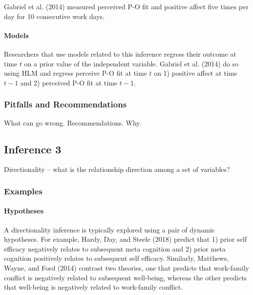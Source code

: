 \documentclass[english,,man]{apa6}
\let\oldparagraph\paragraph
\renewcommand{\paragraph}[1]{\oldparagraph{#1}\mbox{}}
\theoremstyle{definition}
\theoremstyle{definition}
\theoremstyle{definition}
\theoremstyle{remark}
\begin{document}
Gabriel et al. (2014) measured perceived P-O fit and positive affect
five times per day for 10 consecutive work days.

\hypertarget{models-8}{%
\paragraph{Models}\label{models-8}}

Researchers that use models related to this inference regress their
outcome at time \(t\) on a prior value of the independent variable.
Gabriel et al. (2014) do so using HLM and regress perceive P-O fit at
time \(t\) on 1) positive affect at time \(t-1\) and 2) perceived P-O
fit at time \(t-1\).

\hypertarget{pitfalls-and-recommendations-8}{%
\subsubsection{Pitfalls and
Recommendations}\label{pitfalls-and-recommendations-8}}

What can go wrong. Recommendations. Why.

\hypertarget{inference-3-1}{%
\subsection{Inference 3}\label{inference-3-1}}

Directionality -- what is the relationship direction among a set of
variables?

\hypertarget{examples-9}{%
\subsubsection{Examples}\label{examples-9}}

\hypertarget{hypotheses-9}{%
\paragraph{Hypotheses}\label{hypotheses-9}}

A directionality inference is typically explored using a pair of dynamic
hypotheses. For example, Hardy, Day, and Steele (2018) predict that 1)
prior self efficacy negatively relates to subsequent meta cognition and
2) prior meta cognition positively relates to subsequent self efficacy.
Similarly, Matthews, Wayne, and Ford (2014) contrast two theories, one
that predicts that work-family conflict is negatively related to
subsequent well-being, whereas the other predicts that well-being is
negatively related to work-family conflict.
\end{document}
